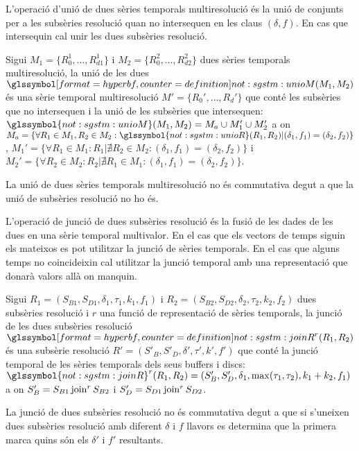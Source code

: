 L'operació d'unió de dues sèries temporals multiresolució és la unió
de conjunts per a les subsèries resolució quan no intersequen en les
claus $(\delta,f)$. En cas que intersequin cal unir les dues subsèries
resolució.
\begin{definition}
  Sigui $M_1=\{R_0^1,\dotsc,R_{d1}^1\}$ i
  $M_2=\{R_0^2,\dotsc,R_{d2}^2\}$ dues sèries temporals
  multiresolució, la unió de les dues
  $\glssymboldef{not:sgstm:unioM}(M_1, M_2)$ és una sèrie temporal
  multiresolució $M'=\{R_0',\dotsc,R_d'\}$ que conté les subsèries que
  no intersequen i la unió de les subsèries que intersequen:
  $\glssymbol{not:sgstm:unioM}(M_1, M_2)= M_{a} \cup M'_{1} \cup
  M'_{2}$ a on $M_a = \{\forall R_1\in M_1,R_2\in M_2:
  \glssymbol{not:sgstm:unioR}(R_1,R_2) | (\delta_1,f_1) =
  (\delta_2,f_2) \}$, $M_1' =\{\forall R_1\in M_1: R_1 | \nexists R_2
  \in M_2 : (\delta_1,f_1) = (\delta_2,f_2) \}$ i $M_2' =\{\forall
  R_2\in M_2: R_2 | \nexists R_1 \in M_1 : (\delta_1,f_1) =
  (\delta_2,f_2) \}$.
\end{definition}
La unió de dues sèries temporals multiresolució no és commutativa
degut a que la unió de subsèries resolució no ho és.





L'operació de junció de dues subsèries resolució és la fusió de les
dades de les dues en una sèrie temporal multivalor. En el cas que els
vectors de temps siguin els mateixos es pot utilitzar la junció de
sèries temporals. En el cas que alguns temps no coincideixin cal
utilitzar la junció temporal amb una representació que donarà valors
allà on manquin.
\begin{definition}
  Sigui $R_1=(S_{B1},S_{D1},\delta_1,\tau_1,k_1,f_1)$ i
  $R_2=(S_{B2},S_{D2},\delta_2,\tau_2,k_2,f_2)$ dues subsèries
  resolució i $r$ una funció de representació de sèries temporals, la
  junció de les dues subsèries resolució
  $\glssymboldef{not:sgstm:joinR}^r(R_1,R_2)$ és una subsèrie
  resolució $R' = (S'_B,S'_D,\delta',\tau',k',f')$ que conté la junció
  temporal de les sèries temporals dels seus buffers i discs:
  $\glssymbol{not:sgstm:joinR}^r(R_1,R_2)=
  (S'_B,S'_D,\delta_1,\max(\tau_1,\tau_2),k_1+k_2,f_1)$ a on $S'_B =
  S_{B1} \operatorname*{join}^r S_{B2}$ i $S'_D = S_{D1} \operatorname*{join}^r S_{D2}$.
\end{definition}
La junció de dues subsèries resolució no és commutativa degut a que si
s'uneixen dues subsèries resolució amb diferent $\delta$ i $f$ llavors
es determina que la primera marca quins són els $\delta'$ i $f'$
resultants.



